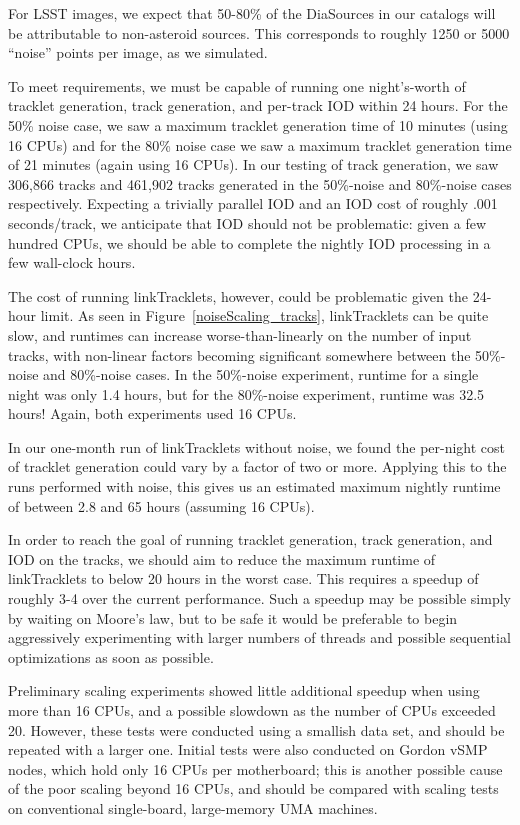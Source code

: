 For LSST images, we expect that 50-80\% of the DiaSources in our
catalogs will be attributable to non-asteroid sources.  This
corresponds to roughly 1250 or 5000 ``noise'' points per image, as we
simulated.

To meet requirements, we must be capable of running one night's-worth
of tracklet generation, track generation, and per-track IOD within 24
hours.  For the 50\% noise case, we saw a maximum tracklet generation
time of 10 minutes (using 16 CPUs) and for the 80\% noise case we saw
a maximum tracklet generation time of 21 minutes (again using 16
CPUs).  In our testing of track generation, we saw 306,866 tracks and
461,902 tracks generated in the 50\%-noise and 80\%-noise cases
respectively.  Expecting a trivially parallel IOD and an IOD cost of
roughly .001 seconds/track, we anticipate that IOD should not be
problematic: given a few hundred CPUs, we should be able to complete
the nightly IOD processing in a few wall-clock hours.

The cost of running linkTracklets, however, could be problematic given
the 24-hour limit.  As seen in Figure~\ref{noiseScaling_tracks},
linkTracklets can be quite slow, and runtimes can increase
worse-than-linearly on the number of input tracks, with non-linear
factors becoming significant somewhere between the 50\%-noise and
80\%-noise cases.  In the 50\%-noise experiment, runtime for a single
night was only 1.4 hours, but for the 80\%-noise experiment, runtime
was 32.5 hours!  Again, both experiments used 16 CPUs.  

In our one-month run of linkTracklets without noise, we found the
per-night cost of tracklet generation could vary by a factor of two or
more.  Applying this to the runs performed with noise, this gives us
an estimated maximum nightly runtime of between 2.8 and 65
hours (assuming 16 CPUs).

In order to reach the goal of running tracklet generation, track
generation, and IOD on the tracks, we should aim to reduce the maximum
runtime of linkTracklets to below 20 hours in the worst case.  This
requires a speedup of roughly 3-4 over the current performance.  Such
a speedup may be possible simply by waiting on Moore's law, but to be
safe it would be preferable to begin aggressively experimenting with
larger numbers of threads and possible sequential optimizations as
soon as possible.  

Preliminary scaling experiments showed little additional speedup when
using more than 16 CPUs, and a possible slowdown as the number of CPUs
exceeded 20.  However, these tests were conducted using a smallish
data set, and should be repeated with a larger one.  Initial tests
were also conducted on Gordon vSMP nodes, which hold only 16 CPUs per
motherboard; this is another possible cause of the poor scaling beyond
16 CPUs, and should be compared with scaling tests on conventional
single-board, large-memory UMA machines.
